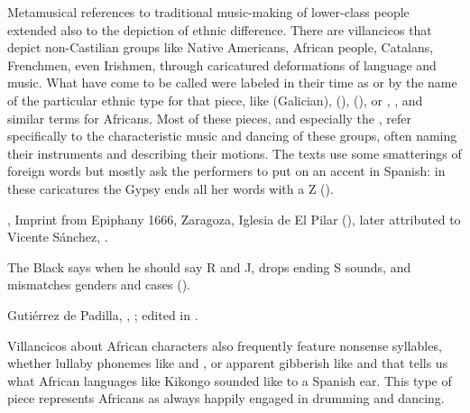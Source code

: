 Metamusical references to traditional music-making of lower-class people
extended also to the depiction of ethnic difference.
There are villancicos that depict non-Castilian groups like Native Americans,
African people, Catalans, Frenchmen, even Irishmen, through caricatured
deformations of language and music.%
    \Autocites
    {Baker:EthnicVC}
    {Baker:PerformancePostColonial}
    {Davies:LocalContent}
    {AlvesSimao:VillancicosDeNegros}
    {Molinero:Negros}
    {Santamaria:Negrillas}
    {Goldberg:SonidosNegros}
What have come to be called  were labeled in their
time as  or by the name of the particular ethnic
type for that piece, like  (Galician), 
(),  (), or ,
, and similar terms for Africans.
Most of these pieces, and especially the , refer
specifically to the characteristic music and dancing of these groups, often
naming their instruments and describing their motions.
The texts use some smatterings of foreign words but mostly ask the performers
to put on an accent in Spanish: in these caricatures the Gypsy ends all her
words with a Z ().
\begin{Footnote}
    , Imprint from Epiphany 1666, Zaragoza,
    Iglesia de El Pilar (), later attributed to Vicente
    Sánchez, .
\end{Footnote}
The Black says when he should say R and J, drops ending S sounds, and
mismatches genders and cases ().%
\begin{Footnote}
    Gutiérrez de Padilla, ,
    ; edited in \autocite{Cashner:WLSCM32}.
\end{Footnote}
Villancicos about African characters also frequently feature nonsense
syllables, whether lullaby phonemes like  and , or apparent gibberish like  and
 that tells us what African languages like Kikongo
sounded like to a Spanish ear.%
This type of piece represents Africans as always happily engaged in drumming
and dancing.

